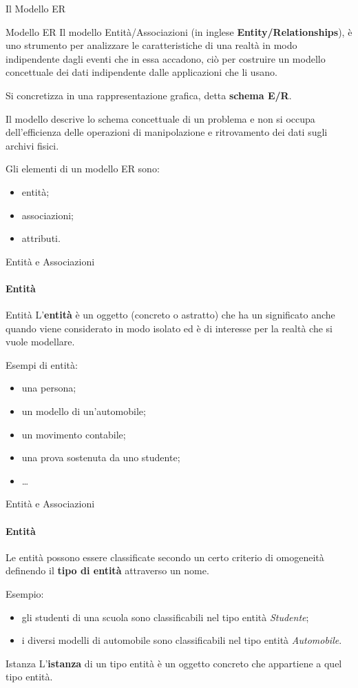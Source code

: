 \begin{frame}{Il Modello ER}
\vspace{.5cm}
\begin{block}{Modello ER}
Il modello Entit\`a/Associazioni (in inglese \textbf{Entity/Relationships}), \`e uno strumento per analizzare le caratteristiche di una realt\`a in modo indipendente dagli eventi che in essa accadono, ci\`o per costruire un modello concettuale dei dati indipendente dalle applicazioni che li usano.

Si concretizza in una rappresentazione grafica, detta \textbf{schema E/R}.
\end{block}
\pause
Il modello descrive lo schema concettuale di un problema e non si occupa dell'efficienza delle operazioni di manipolazione e ritrovamento dei dati sugli archivi fisici.
\pause

Gli elementi di un modello ER sono:
\begin{itemize}
    \item entit\`a;
    \item associazioni;
    \item attributi.
\end{itemize}
\end{frame}
%
\begin{frame}{Entit\`a e Associazioni}
\framesubtitle{Entit\`a}
\begin{block}{Entit\`a}
L'\textbf{entit\`a} \`e un oggetto (concreto o astratto) che ha un significato anche quando viene considerato in modo isolato ed \`e di interesse per la realt\`a che si vuole modellare.
\end{block}
\pause
Esempi di entit\`a:
\begin{itemize}
    \item una persona;
    \item un modello di un'automobile;
    \item un movimento contabile;
    \item una prova sostenuta da uno studente;
    \item \ldots
\end{itemize}
\end{frame}
%
\begin{frame}{Entit\`a e Associazioni}
\framesubtitle{Entit\`a}
Le entit\`a possono essere classificate secondo un certo criterio di omogeneit\`a definendo il \textbf{tipo di entit\`a} attraverso un nome.
\pause
\vspace{.3cm}

Esempio:
\begin{itemize}
    \item gli studenti di una scuola sono classificabili nel tipo entit\`a \textit{Studente};
    \item i diversi modelli di automobile sono classificabili nel tipo entit\`a \textit{Automobile}.
\end{itemize}

\pause

\begin{block}{Istanza}
L'\textbf{istanza} di un tipo entit\`a \`e un oggetto concreto che appartiene a quel tipo entit\`a.
\end{block}
\end{frame}
